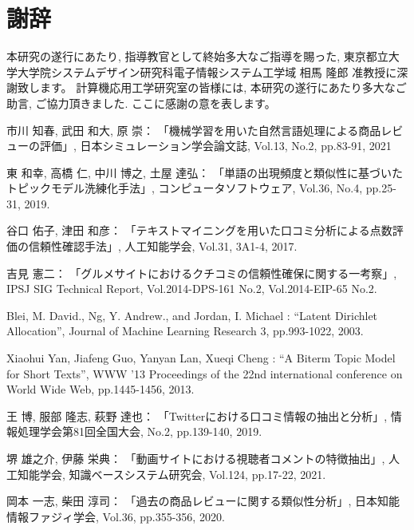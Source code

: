 \documentclass{ltjarticle}
\begin{document}
\newpage
\part*{謝辞}
本研究の遂行にあたり, 指導教官として終始多大なご指導を賜った, 
東京都立大学大学院システムデザイン研究科電子情報システム工学域 相馬 隆郎 准教授に深謝致します。
計算機応用工学研究室の皆様には, 本研究の遂行にあたり多大なご助言, ご協力頂きました. ここに感謝の意を表します。
\newpage
\begin{thebibliography}{99}
    市川 知春, 武田 和大, 原 崇：
    \newblock 「機械学習を用いた自然言語処理による商品レビューの評価」, 
    \newblock 日本シミュレーション学会論文誌, Vol.13, No.2, pp.83-91, 2021

    東 和幸, 高橋 仁, 中川 博之, 土屋 達弘：
    \newblock 「単語の出現頻度と類似性に基づいたトピックモデル洗練化手法」, 
    \newblock コンピュータソフトウェア, Vol.36, No.4, pp.25-31, 2019.

    谷口 佑子, 津田 和彦：
    \newblock 「テキストマイニングを用いた口コミ分析による点数評価の信頼性確認手法」, 
    \newblock 人工知能学会, Vol.31, 3A1-4, 2017.

    吉見 憲二：
    \newblock 「グルメサイトにおけるクチコミの信頼性確保に関する一考察」, 
    \newblock IPSJ SIG Technical Report, Vol.2014-DPS-161 No.2, Vol.2014-EIP-65 No.2.   

    Blei, M. David., Ng, Y. Andrew., and Jordan, I. Michael : 
    \newblock ``Latent Dirichlet Allocation'', 
    \newblock Journal of Machine Learning Research 3, pp.993-1022, 2003.

    Xiaohui Yan, Jiafeng Guo, Yanyan Lan, Xueqi Cheng :
    \newblock ``A Biterm Topic Model for Short Texts'', 
    \newblock WWW '13 Proceedings of the 22nd international conference on World Wide Web, pp.1445-1456, 2013.

    王 博, 服部 隆志, 萩野 達也：
    \newblock 「Twitterにおける口コミ情報の抽出と分析」,
    \newblock 情報処理学会第81回全国大会, No.2, pp.139-140, 2019.

    堺 雄之介, 伊藤 栄典：
    \newblock 「動画サイトにおける視聴者コメントの特徴抽出」,
    \newblock 人工知能学会, 知識ベースシステム研究会, Vol.124, pp.17-22, 2021.

    岡本 一志, 柴田 淳司：
    \newblock 「過去の商品レビューに関する類似性分析」,
    \newblock 日本知能情報ファジィ学会, Vol.36, pp.355-356, 2020.


\end{thebibliography}
\end{document}
